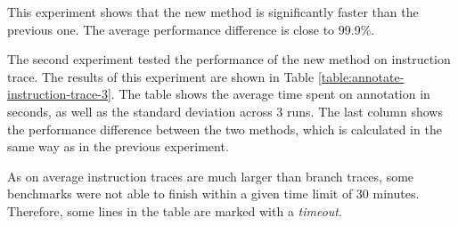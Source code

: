 This experiment shows that the new method is significantly faster than the previous one. The average performance difference is close to 99.9\%.

The second experiment tested the performance of the new method on instruction trace. The results of this experiment are shown in Table \ref{table:annotate-instruction-trace-3}. The table shows the average time spent on annotation in seconds, as well as the standard deviation across 3 runs. The last column shows the performance difference between the two methods, which is calculated in the same way as in the previous experiment.

As on average instruction traces are much larger than branch traces, some benchmarks were not able to finish within a given time limit of 30 minutes. Therefore, some lines in the table are marked with a \textit{timeout}.

